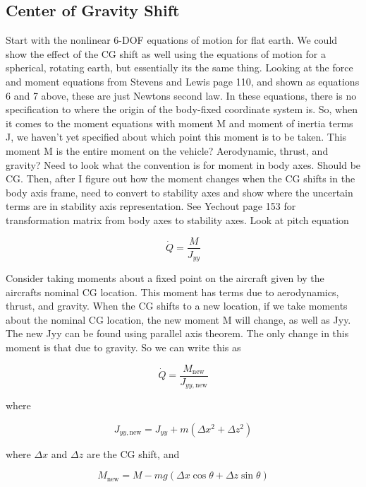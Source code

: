 \subsection{Center of Gravity Shift}

Start with the nonlinear 6-DOF equations of motion for flat earth.
We could show the effect of the CG shift as well using the equations of motion for a spherical, rotating earth, but essentially its the same thing.
Looking at the force and moment equations from Stevens and Lewis page 110, and shown as equations 6 and 7 above, these are just Newtons second law.
In these equations, there is no specification to where the origin of the body-fixed coordinate system is.
So, when it comes to the moment equations with moment M and moment of inertia terms J, we haven't yet specified about which point this moment is to be taken.
This moment M is the entire moment on the vehicle? Aerodynamic, thrust, and gravity?
Need to look what the convention is for moment in body axes.
Should be CG.\@
Then, after I figure out how the moment changes when the CG shifts in the body axis frame, need to convert to stability axes and show where the uncertain terms are in stability axis representation.
See Yechout page 153 for transformation matrix from body axes to stability axes.
Look at pitch equation

\begin{equation*}
  \dot{Q}=\frac{M}{J_{yy}}
\end{equation*}

Consider taking moments about a fixed point on the aircraft given by the aircrafts nominal CG location.
This moment has terms due to aerodynamics, thrust, and gravity.
When the CG shifts to a new location, if we take moments about the nominal CG location, the new moment M will change, as well as Jyy.
The new Jyy can be found using parallel axis theorem.
The only change in this moment is that due to gravity.
So we can write this as

\begin{equation*}
  \dot{Q}=\frac{M_{\text{new}}}{J_{yy,\text{new}}}
\end{equation*}

where

\begin{equation*}
  J_{yy,\text{new}}=J_{yy}+m(\Delta x^{2}+\Delta z^{2})
\end{equation*}

where $\Delta x$ and $\Delta z$ are the CG shift, and

\begin{equation*}
  M_{\text{new}}=M-mg(\Delta x\cos\theta+\Delta z\sin\theta)
\end{equation*}

